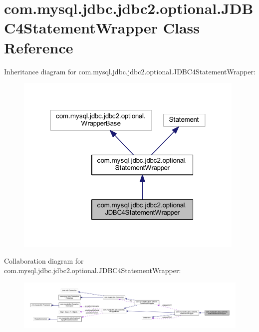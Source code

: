 \hypertarget{classcom_1_1mysql_1_1jdbc_1_1jdbc2_1_1optional_1_1_j_d_b_c4_statement_wrapper}{}\section{com.\+mysql.\+jdbc.\+jdbc2.\+optional.\+J\+D\+B\+C4\+Statement\+Wrapper Class Reference}
\label{classcom_1_1mysql_1_1jdbc_1_1jdbc2_1_1optional_1_1_j_d_b_c4_statement_wrapper}


Inheritance diagram for com.\+mysql.\+jdbc.\+jdbc2.\+optional.\+J\+D\+B\+C4\+Statement\+Wrapper\+:
\nopagebreak
\begin{figure}[H]
\begin{center}
\leavevmode
\includegraphics[width=312pt]{classcom_1_1mysql_1_1jdbc_1_1jdbc2_1_1optional_1_1_j_d_b_c4_statement_wrapper__inherit__graph}
\end{center}
\end{figure}


Collaboration diagram for com.\+mysql.\+jdbc.\+jdbc2.\+optional.\+J\+D\+B\+C4\+Statement\+Wrapper\+:
\nopagebreak
\begin{figure}[H]
\begin{center}
\leavevmode
\includegraphics[width=350pt]{classcom_1_1mysql_1_1jdbc_1_1jdbc2_1_1optional_1_1_j_d_b_c4_statement_wrapper__coll__graph}
\end{center}
\end{figure}
